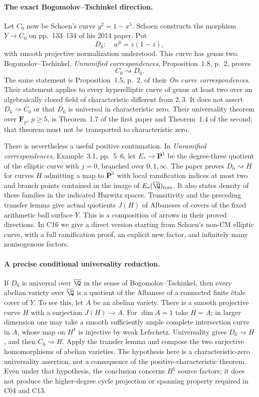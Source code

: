 \paragraph{The exact Bogomolov--Tschinkel direction.}
Let $C_0$ now be Schoen's curve $y^2=1-x^5$.  Schoen constructs the morphism
$Y\to C_0$ on pp.~133--134 of his 2014 paper.  Put
\[
 D_6:\quad w^6=z(1-z),
\]
with smooth projective normalization understood.  This curve has genus two.
Bogomolov--Tschinkel, \emph{Unramified correspondences}, Proposition~1.8,
p.~2, proves
\[
 C_0\rightsquigarrow D_6.
\]
The same statement is Proposition~1.5, p.~2, of their
\emph{On curve correspondences}.  Their statement applies to every
hyperelliptic curve of genus at least two over an algebraically closed field
of characteristic different from $2,3$.  It does not assert
$D_6\rightsquigarrow C_0$ or that $D_6$ is universal in characteristic zero.
Their universality theorem over $\overline{\mathbf F}_p$, $p\geq5$, is
Theorem~1.7 of the first paper and Theorem~1.4 of the second; that theorem
must not be transported to characteristic zero.

There is nevertheless a useful positive continuation.  In
\emph{Unramified correspondences}, Example~3.1, pp.~5--6, let
$E_*\to\mathbf P^1$ be the degree-three quotient of the elliptic curve
with $j=0$, branched over $0,1,\infty$.  The paper proves
$D_6\rightsquigarrow H$ for curves $H$ admitting a map to $\mathbf P^1$
with local ramification indices at most two and branch points contained in
the image of $E_*(\overline{\Q})_{\rm tors}$.  It also states density of
these families in the indicated Hurwitz spaces.  Transitivity and the
preceding transfer lemma give actual quotients $J(H)$ of Albaneses of
covers of the fixed arithmetic ball surface $Y$.  This is a composition
of arrows in their proved directions.  In C16 we give a direct version
starting from Schoen's non-CM elliptic curve, with a full ramification
proof, an explicit new factor, and infinitely many nonisogenous factors.

\paragraph{A precise conditional universality reduction.}
If $D_6$ is universal over $\overline{\Q}$ in the sense of
Bogomolov--Tschinkel, then every abelian variety over $\overline{\Q}$ is a
quotient of the Albanese of a connected finite \'{e}tale cover of $Y$.
To see this, let $A$ be an abelian variety.  There is a smooth projective
curve $H$ with a surjection $J(H)\to A$.  For $\dim A=1$ take $H=A$;
in larger dimension one may take a smooth sufficiently ample complete
intersection curve in $A$, whose map on $H^1$ is injective by weak
Lefschetz.  Universality gives $D_6\rightsquigarrow H$, and then
$C_0\rightsquigarrow H$.  Apply the transfer lemma and compose the two
surjective homomorphisms of abelian varieties.  The hypothesis here is a
characteristic-zero universality assertion, not a consequence of the
positive-characteristic theorem.  Even under that hypothesis, the conclusion
concerns $H^1$ source factors; it does not produce the higher-degree cycle
projection or spanning property required in C04 and C13.

